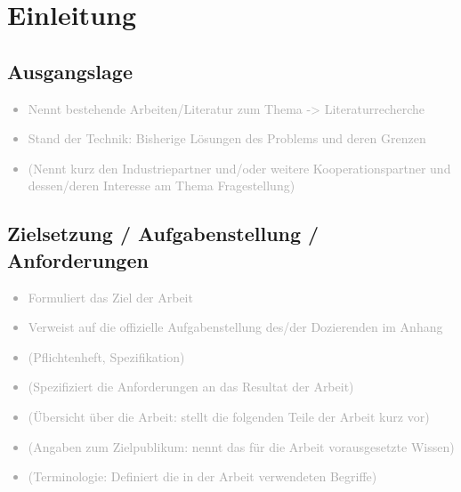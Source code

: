 \chapter{Einleitung}
\label{sec:Einleitung}

\section{Ausgangslage}
\label{sec:Ausgangslage}

\textcolor{darkgray}{
  \begin{itemize}
  \item Nennt bestehende Arbeiten/Literatur zum Thema -> Literaturrecherche
  \item Stand der Technik: Bisherige Lösungen des Problems und deren Grenzen
  \item (Nennt kurz den Industriepartner und/oder weitere Kooperationspartner und dessen/deren Interesse am Thema Fragestellung)
  \end{itemize}
}

\section{Zielsetzung / Aufgabenstellung / Anforderungen}
\label{sec:ZielsetzungAufgabenstellungAnforderungen}

\textcolor{darkgray}{
  \begin{itemize}
  \item Formuliert das Ziel der Arbeit
  \item Verweist auf die offizielle Aufgabenstellung des/der Dozierenden im Anhang
  \item (Pflichtenheft, Spezifikation)
  \item (Spezifiziert die Anforderungen an das Resultat der Arbeit)
  \item (Übersicht über die Arbeit: stellt die folgenden Teile der Arbeit kurz vor)
  \item (Angaben zum Zielpublikum: nennt das für die Arbeit vorausgesetzte Wissen)
  \item (Terminologie: Definiert die in der Arbeit verwendeten Begriffe)
  \end{itemize}
}